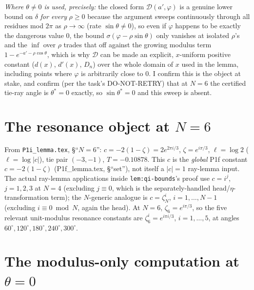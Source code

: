 \documentclass[11pt]{article}
\begin{document}
\emph{Where $\theta\ne0$ is used, precisely:} the closed form $\mathcal D(a',\varphi)$ is a genuine lower
bound on $\delta$ \emph{for every} $\rho\ge0$ because the argument sweeps continuously through all residues
mod $2\pi$ as $\rho\to\infty$ (rate $\sin\theta\ne0$), so even if $\varphi$ happens to be exactly the
dangerous value $0$, the bound $\sigma(\varphi-\rho\sin\theta)$ only vanishes at isolated $\rho$'s and the
$\inf$ over $\rho$ trades that off against the growing modulus term $1-e^{-a'-\rho\cos\theta}$, which is why
$\mathcal D$ can be made an explicit, $x$-uniform positive constant ($d(x)$, $d'(x)$, $D_n$) over the whole
domain of $x$ used in the lemma, including points where $\varphi$ is arbitrarily close to $0$. I confirm
this is the object at stake, and confirm (per the task's DO-NOT-RETRY) that at $N=6$ the certified tie-ray
angle is $\theta^*=0$ exactly, so $\sin\theta^*=0$ and this sweep is absent.

\section{The resonance object at $N=6$}

From \texttt{P1i\_lemma.tex}, \S``$N=6$'': $c=-2(1-\zeta)=2e^{2\pi i/3}$, $\zeta=e^{i\pi/3}$, $\ell=\log2$
($\ell=\log|c|$), tie pair $(-3,-1)$, $T=-0.10878$. This $c$ is the \emph{global} P1f constant
$c=-2(1-\zeta)$ (P1f\_lemma.tex, \S``set''), not itself a $|c|=1$ ray-lemma input. The actual ray-lemma
applications inside \texttt{lem:qi-bounds}'s proof use $c=i^j$, $j=1,2,3$ at $N=4$ (excluding $j\equiv0$,
which is the separately-handled head/$\eta$-transformation term); the $N$-generic analogue is $c=\zeta_N^i$,
$i=1,\dots,N-1$ (excluding $i\equiv0\bmod N$, again the head). At $N=6$, $\zeta_6=e^{i\pi/3}$, so the five
relevant unit-modulus resonance constants are $\zeta_6^i=e^{i\pi i/3}$, $i=1,\dots,5$, at angles
$60^\circ,120^\circ,180^\circ,240^\circ,300^\circ$.

\section{The modulus-only computation at $\theta=0$}
\end{document}
